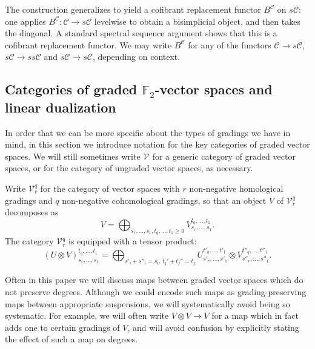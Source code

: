 \documentclass[11pt]{amsart} \renewcommand{\baselinestretch}{1.2}
\theoremstyle{plain}
\theoremstyle{definition}
\renewcommand{\to}{\longrightarrow}
\newcommand{\calV}{\mathcal{V}}
\newcommand{\calc}{\mathcal{C}}
\newcommand{\vect}[2]{\calV^{#1}_{#2}}
\newcommand{\F}{\mathbb{F}}
\newcommand{\Ftwo}{\F_2}
\begin{document}
\begin{Conventions and notation}
The construction generalizes to yield a cofibrant replacement functor $B^{\calc}$ on $s\calc$: one applies  $B^{\calc}:\calc\to s\calc$ levelwise to obtain a bisimplicial object, and then takes the diagonal. A standard spectral sequence argument shows that this is a cofibrant replacement functor. We may write $B^{\calc}$ for any of the functors $\calc\to s\calc$, $s\calc\to ss\calc$ and $s\calc\to s\calc$, depending on context.




\subsection{Categories of graded $\Ftwo $-vector spaces and linear dualization}
In order that we can be more specific about the types of gradings we have in mind, in this section we introduce  notation for the key categories of graded vector spaces. We will still sometimes write $\vect{}{}$ for a generic category of graded vector spaces, or for the category of ungraded vector spaces, as necessary.

Write $\vect{q}{r}$ for the category of vector spaces with $r$ non-negative homological gradings and $q$ non-negative cohomological gradings, so that an object $V$ of $\vect{q}{r}$ decomposes as
\[V=\bigoplus_{s_r,\ldots,s_1,t_q,\ldots,t_1\geq0}V^{t_q,\ldots,t_1}_{s_r,\ldots,s_1}.\]
The category $\vect{q}{r}$ is equipped with a tensor product:
\[(U\otimes V)^{t_q,\ldots,t_1}_{s_r,\ldots,s_1}=\bigoplus_{s'_i+s''_i=s_i,\,t_j'+t_j''=t_j}U^{t'_q,\ldots,t'_1}_{s'_r,\ldots,s'_1}\otimes V^{t''_q,\ldots,t''_1}_{s''_r,\ldots,s''_1}.\]

Often in this paper we will discuss maps between graded vector spaces which do not preserve degrees. %
Although we could encode such maps as grading-preserving maps between appropriate suspensions, we will systematically avoid being so systematic. For example, we will often write $V\otimes V\to V$ for a map which in fact adds one to certain gradings of $V$, and will avoid confusion by explicitly stating the effect of such a map on degrees.


\end{Conventions and notation}
\end{document}
